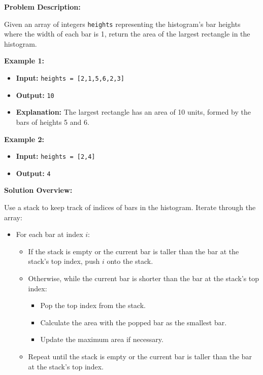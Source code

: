 

\textbf{Problem Description:}

Given an array of integers \texttt{heights} representing the histogram's bar heights where the width of each bar is 1, return the area of the largest rectangle in the histogram.

\textbf{Example 1:}

\begin{itemize}
    \item \textbf{Input:} \texttt{heights = [2,1,5,6,2,3]}
    \item \textbf{Output:} \texttt{10}
    \item \textbf{Explanation:} The largest rectangle has an area of 10 units, formed by the bars of heights 5 and 6.
\end{itemize}

\textbf{Example 2:}

\begin{itemize}
    \item \textbf{Input:} \texttt{heights = [2,4]}
    \item \textbf{Output:} \texttt{4}
\end{itemize}

\textbf{Solution Overview:}

Use a stack to keep track of indices of bars in the histogram. Iterate through the array:

\begin{itemize}
    \item For each bar at index \( i \):
        \begin{itemize}
            \item If the stack is empty or the current bar is taller than the bar at the stack's top index, push \( i \) onto the stack.
            \item Otherwise, while the current bar is shorter than the bar at the stack's top index:
                \begin{itemize}
                    \item Pop the top index from the stack.
                    \item Calculate the area with the popped bar as the smallest bar.
                    \item Update the maximum area if necessary.
                \end{itemize}
            \item Repeat until the stack is empty or the current bar is taller than the bar at the stack's top index.
        \end{itemize}
\end{itemize}

